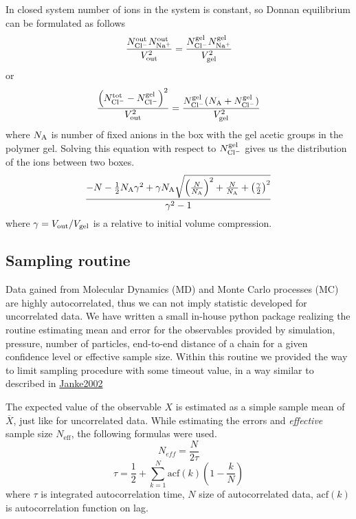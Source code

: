 \documentclass[journal=mamobx, layout=twocolumns,manuscript=article]{achemso}
\begin{document}
In closed system number of ions in the system is constant, so Donnan equilibrium can be formulated as follows
\begin{equation}
    \frac{N_\mathrm{Cl^-}^{\mathrm{out}}N_\mathrm{Na^+}^{\mathrm{out}}}{V_\mathrm{out}^2} = \frac{N_\mathrm{Cl^-}^\mathrm{gel}N_\mathrm{Na^+}^\mathrm{gel}}{V_\mathrm{gel}^2}
\end{equation}
or
\begin{equation}
    \frac{\left(N_\mathrm{Cl^-}^\mathrm{tot} - N_\mathrm{Cl^-}^\mathrm{gel}\right)^2}{V_\mathrm{out}^2} = \frac{N_\mathrm{Cl^-}^\mathrm{gel} (N_{\mathrm{A}} + N_\mathrm{Cl^-}^\mathrm{gel})}{V_\mathrm{gel}^2}
\end{equation}
where $N_{\mathrm{A}}$ is number of fixed anions in the box with the gel \ie acetic groups in the polymer gel.
Solving this equation with respect to $N_\mathrm{Cl^-}^\mathrm{gel}$ gives us the distribution of the ions between two boxes.
\begin{equation}
\frac{- N - \frac{1}{2}N_{\mathrm{A}} \gamma^{2} + \gamma N_{\mathrm{A}} \sqrt{\left(\frac{N}{N_{\mathrm{A}}}\right)^{2} + \frac{N}{N_{\mathrm{A}}} +  \left(\frac{\gamma}{2}\right)^{2}}}{\gamma^{2} - 1 }
\end{equation}
where $\gamma = V_\mathrm{out}/V_\mathrm{gel}$ is a relative to initial volume compression.


\subsection{Sampling routine}
Data gained from Molecular Dynamics (MD) and Monte Carlo processes (MC) are highly autocorrelated, thus we can not imply statistic developed for uncorrelated data. 
We have written a small in-house python package realizing the routine estimating mean and error for the observables provided by simulation, \ie pressure, number of particles, end-to-end distance of a chain for a given confidence level or effective sample size. 
Within this routine we provided the way to limit sampling procedure with some timeout value, in a way similar to described in \href{https://www.physik.uni-leipzig.de/~janke/Paper/nic10_423_2002.pdf}{Janke2002}

The expected value of the observable $X$ is estimated as a simple sample mean of $\overline{X}$, just like for uncorrelated data. While estimating the errors and \emph{effective} sample size $N_{\text{eff}}$, the following formulas were used.
\begin{equation}
    N_{eff} = \frac{N}{2\tau}
\end{equation}    
\begin{equation}
    \tau  = \frac{1}{2} + \sum_{k=1}^{N} \text{acf} (k) (1-\frac{k}{N})
\end{equation}
where $\tau$ is integrated autocorrelation time, $N$ size of autocorrelated data, $\text{acf} (k)$ is autocorrelation function on lag.
\end{document}
